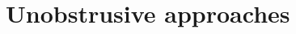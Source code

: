 \section{Unobstrusive approaches}
\begin{comment}

    Sleep is one of the most important physiological functions. Sleep quality can affect physical 
    and mental wellness; for this reason,
    it is crucial to monitor vital signs without interfering with natural sleep. 
    The state-of-the-art to monitor physiological data during sleep is polysomnography \cite{Penzel2016ModulationsPolysomnography}
    , which involves recording sleep stages, respiratory rate, heart and other parameters. However, this procedure is time-consuming, 
    complicated, expensive, invasive for the patient and only sometimes available in hospitals. For this reason, it is nowadays 
    acceptable to use cardiorespiratory polysomnography that does not track neurophysiological variables. 
    This type of polysomnography
    involves a cannula, chest belts and electrodes for an electrocardiogram (ECG) but does not involve an electroencephalogram (EEG).
   
    Another reason why this kind of instrument is widely used is that inside the population, we have a higher percentage of 
    sleep-related breathing disorders that can be studied and monitored with this instrument, like sleep apnoea/hypopnoea syndrome (SAS), 
    where the individuals experience a collapse 
    of the airway in deeper sleep states. The ability to monitor it allows for a faster and closer intervention in severe cases. 
    The sleep cycle of a person is divided into two phases Non-Rapid Eye Movement (NREM) and Rapid Eye Movement (REM);
    this second phase is further divided into three other stages (N1-N3). Different muscle tones, brain wave patterns, 
    eye movements, and heart and breathing rate alterations characterise every phase and stage.
    Focusing on one of the vital signs that characterise the different sleep stages is the respiratory rate 
    which slowly becomes more stable going from the awake to the REM phase; this characterisation of the different stages gives the possibility to 
    understand in which stage a person is based just on the respiratory signal.
    As said before, the state-of-art is a cumbersome device that requires cables attached to the users' bodies and often interferes with natural sleep. To avoid it, in literature is possible to find new instruments like video cameras which lead to privacy concerns, radar technology that could have problems in case there are more than one person inside the room or smartwatches that are also able to track respiratory rate but involve to have something on the arm that still can lead to discomfort.
    

\end{comment}
